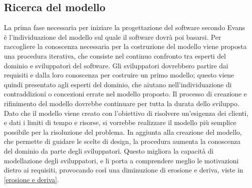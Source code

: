 \documentclass[12pt]{report}
\begin{document}
\subsection{Ricerca del modello}
La prima fase necessaria per iniziare la progettazione del software secondo Evans è l'individuazione del modello sul quale il software dovrà poi basarsi. 
Per raccogliere la conoscenza necessaria per la costruzione del modello viene proposta una procedura iterativa, che consiste nel continuo confronto tra esperti del dominio e sviluppatori del software.
Gli sviluppatori dovrebbero partire dai requisiti e dalla loro conoscenza per costruire un primo modello; questo viene quindi presentato agli esperti del dominio, che aiutano nell'individuazione di contraddizioni o concezioni errate nel modello proposto.
Il processo di creazione e rifinimento del modello dovrebbe continuare per tutta la durata dello sviluppo. 
Dato che il modello viene creato con l'obiettivo di risolvere un'esigenza dei clienti, e dati i limiti di tempo e risorse, si vorrebbe realizzare il modello più semplice possibile per la risoluzione del problema.
In aggiunta alla creazione del modello, che permette di guidare le scelte di design, la procedura aumenta la conoscenza del dominio da parte degli sviluppatori.
Questo migliora la capacità di modellazione degli sviluppatori, e li porta a comprendere meglio le motivazioni dietro ai requisiti, provocando così una diminuzione di erosione e deriva, viste in \ref{erosione e deriva}.
\end{document}
